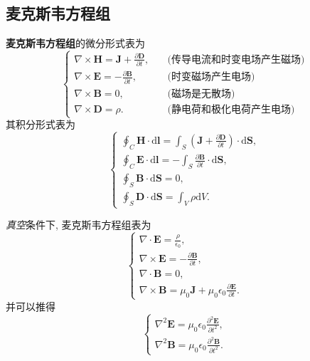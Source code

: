 \subsection{麦克斯韦方程组}
\textbf{麦克斯韦方程组}的微分形式表为
\begin{equation}
    \begin{cases}
        \nabla\times\bm{H}=\bm{J}+\frac{\partial\bm{D}}{\partial t}, & \quad \text{(传导电流和时变电场产生磁场)} \\
        \nabla\times\bm{E}=-\frac{\partial\bm{B}}{\partial t},       & \quad \text{(时变磁场产生电场)}      \\
        \nabla\times\bm{B}=0,                                        & \quad \text{(磁场是无散场)}        \\
        \nabla\times\bm{D}=\rho.                                     & \quad \text{(静电荷和极化电荷产生电场)}
    \end{cases}
\end{equation}
其积分形式表为
\begin{equation} \label{eq:2.6 m int}
    \begin{cases}
        \oint_C\bm{H}\cdot\mathrm{d}\bm{l}=\int_S\left(\bm{J}+\frac{\partial\bm{D}}{\partial t}\right)\cdot\mathrm{d}\bm{S}, \\
        \oint_C\bm{E}\cdot\mathrm{d}\bm{l}=-\int_S\frac{\partial\bm{B}}{\partial t}\cdot\mathrm{d}\bm{S},                    \\
        \oint_S\bm{B}\cdot\mathrm{d}\bm{S}=0,                                                                                \\
        \oint_S\bm{D}\cdot\mathrm{d}\bm{S}=\int_V\rho\mathrm{d}V.
    \end{cases}
\end{equation}

\textit{真空}条件下, 麦克斯韦方程组表为
\begin{equation}
    \begin{cases}
        \nabla\cdot\bm{E}=\frac{\rho}{\epsilon_0},             \\
        \nabla\times\bm{E}=-\frac{\partial\bm{B}}{\partial t}, \\
        \nabla\cdot\bm{B}=0,                                   \\
        \nabla\times\bm{B}=\mu_0\bm{J}+\mu_0\epsilon_0\frac{\partial\bm{E}}{\partial t}.
    \end{cases}
\end{equation}
并可以推得
\begin{equation}
    \begin{cases}
        \nabla^2\bm{E}=\mu_0\epsilon_0\frac{\partial^2\bm{E}}{\partial t^2}, \\
        \nabla^2\bm{B}=\mu_0\epsilon_0\frac{\partial^2\bm{B}}{\partial t^2}.
    \end{cases}
\end{equation}

